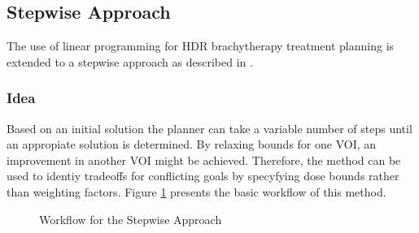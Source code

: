 \documentclass[12pt]{article}
\begin{document}
\subsection{Stepwise Approach}
	The use of linear programming for HDR brachytherapy treatment planning is extended to a stepwise approach as described in \cite{schlaefer}.
	 
	\subsubsection{Idea}
		\label{subsec:lpswIdea}
		Based on an initial solution the planner can take a variable number of steps until an appropiate solution is determined. By relaxing bounds for one VOI, an improvement in another VOI might be achieved. Therefore, the method can be used to identiy tradeoffs for conflicting goals by specyfying dose bounds rather than weighting factors. Figure \ref{fig:lpswWorkflow} presents the basic workflow of this method.
		
		\begin{figure}[ht]
			\centering
			 
			\caption{Workflow for the Stepwise Approach}
			\label{fig:lpswWorkflow}
		\end{figure}
		
\end{document}
